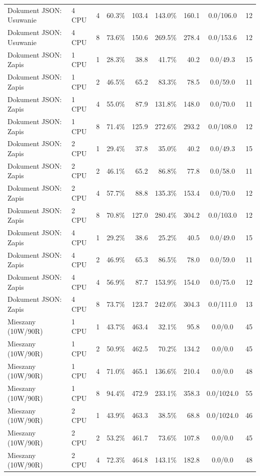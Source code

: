 \begin{table}[ht]
{\begin{tabular}{llcrrrrcc}
Dokument JSON: Usuwanie & 4 CPU & 4 & 60.3\% & 103.4 & 143.0\% & 160.1 & 0.0/106.0 & 12 \\
Dokument JSON: Usuwanie & 4 CPU & 8 & 73.6\% & 150.6 & 269.5\% & 278.4 & 0.0/153.6 & 12 \\
Dokument JSON: Zapis & 1 CPU & 1 & 28.3\% & 38.8 & 41.7\% & 40.2 & 0.0/49.3 & 15 \\
Dokument JSON: Zapis & 1 CPU & 2 & 46.5\% & 65.2 & 83.3\% & 78.5 & 0.0/59.0 & 11 \\
Dokument JSON: Zapis & 1 CPU & 4 & 55.0\% & 87.9 & 131.8\% & 148.0 & 0.0/70.0 & 11 \\
Dokument JSON: Zapis & 1 CPU & 8 & 71.4\% & 125.9 & 272.6\% & 293.2 & 0.0/108.0 & 12 \\
Dokument JSON: Zapis & 2 CPU & 1 & 29.4\% & 37.8 & 35.0\% & 40.2 & 0.0/49.3 & 15 \\
Dokument JSON: Zapis & 2 CPU & 2 & 46.1\% & 65.2 & 86.8\% & 77.8 & 0.0/58.0 & 11 \\
Dokument JSON: Zapis & 2 CPU & 4 & 57.7\% & 88.8 & 135.3\% & 153.4 & 0.0/70.0 & 12 \\
Dokument JSON: Zapis & 2 CPU & 8 & 70.8\% & 127.0 & 280.4\% & 304.2 & 0.0/103.0 & 12 \\
Dokument JSON: Zapis & 4 CPU & 1 & 29.2\% & 38.6 & 25.2\% & 40.5 & 0.0/49.0 & 15 \\
Dokument JSON: Zapis & 4 CPU & 2 & 46.9\% & 65.3 & 86.5\% & 78.0 & 0.0/59.0 & 11 \\
Dokument JSON: Zapis & 4 CPU & 4 & 56.9\% & 87.7 & 153.9\% & 154.0 & 0.0/75.0 & 12 \\
Dokument JSON: Zapis & 4 CPU & 8 & 73.7\% & 123.7 & 242.0\% & 304.3 & 0.0/111.0 & 13 \\
Mieszany (10W/90R) & 1 CPU & 1 & 43.7\% & 463.4 & 32.1\% & 95.8 & 0.0/0.0 & 45 \\
Mieszany (10W/90R) & 1 CPU & 2 & 50.9\% & 462.5 & 70.2\% & 134.2 & 0.0/0.0 & 45 \\
Mieszany (10W/90R) & 1 CPU & 4 & 71.0\% & 465.1 & 136.6\% & 210.4 & 0.0/0.0 & 48 \\
Mieszany (10W/90R) & 1 CPU & 8 & 94.4\% & 472.9 & 233.1\% & 358.3 & 0.0/1024.0 & 55 \\
Mieszany (10W/90R) & 2 CPU & 1 & 43.9\% & 463.3 & 38.5\% & 68.8 & 0.0/1024.0 & 46 \\
Mieszany (10W/90R) & 2 CPU & 2 & 53.2\% & 461.7 & 73.6\% & 107.8 & 0.0/0.0 & 45 \\
Mieszany (10W/90R) & 2 CPU & 4 & 72.3\% & 464.8 & 143.1\% & 182.8 & 0.0/0.0 & 48 \\

\end{tabular}}
\end{table}
